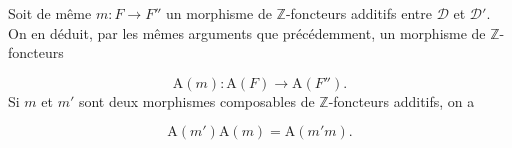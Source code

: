 Soit de même $m\colon F\to F''$ un morphisme de $\mathbb Z$-foncteurs
additifs entre $\mathcal D$ et $\mathcal D'$. On en déduit, par les mêmes
arguments que précédemment, un morphisme de $\mathbb Z$-foncteurs

\[
\mathrm A(m)\colon\mathrm A(F)\longrightarrow\mathrm A(F'').
\tag{3.1.4.4}
\]
Si $m$ et $m'$ sont deux morphismes composables de $\mathbb Z$-foncteurs
additifs, on a

\[
\mathrm A(m')\mathrm A(m)=\mathrm A(m'm).
\tag{3.1.4.5}
\]
\endgroup
